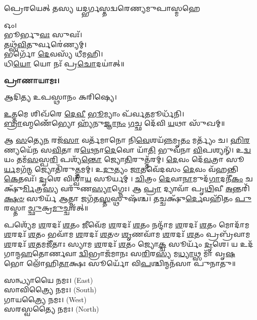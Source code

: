 {𑌪𑍍𑌰𑍇𑌰𑌯𑍇𑌤𑍍 𑌤𑌸𑍍𑌯 𑌯𑌦𑍍𑌭𑌰𑍍𑌗𑌸𑍍𑌤𑌦𑍍𑌵𑌰𑍇𑌣𑍍𑌯𑌮𑍁𑌪𑌾𑌸𑍍𑌮𑌹𑍇}


𑌓𑌂।\\
𑌭𑍂𑌰𑍍𑌭𑍁\-\ul{𑌵𑌃} 𑌸𑍁𑌵𑌃᳴।\\
𑌤𑌥𑍍𑌸᳴\-\ul{𑌵𑌿}\-𑌤𑍁𑌰𑍍𑌵𑌰𑍇॑𑌣𑍍𑌯𑌮𑍍।\\
𑌭𑌰𑍍𑌗𑍋᳴ \ul{𑌦𑍇}\-𑌵𑌸𑍍𑌯᳴ 𑌧𑍀𑌮𑌹𑌿।\\
𑌧𑌿\-\ul{𑌯𑍋} 𑌯𑍋 𑌨𑌃᳴ 𑌪𑍍𑌰\-\ul{𑌚𑍋}\-𑌦𑌯𑌾॑𑌤𑍍॥

\textbf{𑌪𑍍𑌰𑌾𑌣𑌾𑌯𑌾𑌮𑌃।}


𑌆𑌦𑌿𑌤𑍍𑌯 𑌉𑌪𑌸𑍍𑌥𑌾𑌨𑌂 𑌕𑌰𑌿𑌷𑍍𑌯𑍇।

\-\ul{𑌉}\-𑌤𑍍𑌤𑌮𑍇 𑌶𑌿𑌖᳴𑌰𑍇 \ul{𑌦𑍇}\-\-\ul{𑌵𑍀} \ul{𑌭𑍂}\-𑌮𑍍𑌯𑌾𑌂 𑌪᳴𑌰𑍍𑌵\-\ul{𑌤}\-𑌮𑍂𑌰𑍍𑌧᳴𑌨𑌿।\\
\-\ul{𑌬𑍍𑌰𑌾}\-𑌹𑍍𑌮𑌣𑍇᳴᳴𑌭𑍍𑌯𑍋 𑌹𑍍𑌯᳴𑌨𑍁\-\ul{𑌜𑍍𑌞𑌾}\-\-\ul{𑌨𑌂} \ul{𑌗}\-𑌚𑍍𑌛 𑌦𑍇᳴𑌵𑌿 \ul{𑌯}\-𑌥𑌾 𑌸𑍁᳴𑌖𑌮𑍍॥



𑌆 \ul{𑌸}\-𑌤𑍍𑌯𑍇\-\ul{𑌨} 𑌰𑌜᳴\-\ul{𑌸𑌾} 𑌵𑌰𑍍𑌤᳴𑌮𑌾𑌨𑍋 𑌨𑌿\-\ul{𑌵𑍇}\-𑌶𑌯᳴\-\ul{𑌨𑍍𑌨}\-𑌮𑍃\-\ul{𑌤𑌂} 𑌮𑌰𑍍𑌤𑍍𑌯𑌂᳴ 𑌚। \ul{𑌹𑌿}\-\-\ul{𑌰}\-𑌣𑍍𑌯𑌯𑍇᳴𑌨 𑌸\-\ul{𑌵𑌿}\-𑌤𑌾 𑌰\-\ul{𑌥𑍇}\-𑌨𑌾\-\ul{𑌦𑍇}\-𑌵𑍋 𑌯𑌾᳴\-\ul{𑌤𑌿} 𑌭𑍁𑌵᳴𑌨𑌾 \ul{𑌵𑌿}\-𑌪𑌶𑍍𑌯𑌨𑍍᳴। 𑌉\-\ul{𑌦𑍍𑌵}\-𑌯𑌂 𑌤𑌮᳴\-\ul{𑌸}\-𑌸𑍍𑌪\-\ul{𑌰𑌿} 𑌪𑌶𑍍𑌯᳴\-\ul{𑌨𑍍𑌤𑍋} 𑌜𑍍𑌯𑍋\-\ul{𑌤𑌿}\-𑌰𑍁𑌤𑍍𑌤᳴𑌰𑌮𑍍। \ul{𑌦𑍇}\-𑌵𑌂 𑌦𑍇᳴\-\ul{𑌵}\-𑌤𑍍𑌰𑌾 𑌸𑍂\-\ul{𑌰𑍍𑌯}\-𑌮𑌗᳴\-\ul{𑌨𑍍𑌮} 𑌜𑍍𑌯𑍋𑌤𑌿᳴𑌰𑍁\-\ul{𑌤𑍍𑌤}\-𑌮𑌮𑍍। 𑌉\-\ul{𑌦𑍁}\-𑌤𑍍𑌯𑌂 \ul{𑌜𑌾}\-𑌤𑌵𑍇᳴𑌦𑌸𑌂 \ul{𑌦𑍇}\-𑌵𑌂 𑌵᳴𑌹𑌨𑍍𑌤𑌿 \ul{𑌕𑍇}\-𑌤𑌵𑌃᳴। \ul{𑌦𑍃}\-𑌶𑍇 𑌵𑌿𑌶𑍍𑌵𑌾᳴\-\ul{𑌯} 𑌸𑍂𑌰𑍍𑌯𑌮𑍍। \ul{𑌚𑌿}\-𑌤𑍍𑌰𑌂 \ul{𑌦𑍇}\-𑌵𑌾\-\ul{𑌨𑌾}\-𑌮𑍁𑌦᳴\-\ul{𑌗𑌾}\-𑌦𑌨𑍀᳴\-\ul{𑌕𑌂} 𑌚𑌕𑍍𑌷𑍁᳴\-\ul{𑌰𑍍𑌮𑌿}\-𑌤𑍍𑌰\-\ul{𑌸𑍍𑌯} 𑌵𑌰𑍁᳴𑌣\-\ul{𑌸𑍍𑌯𑌾}\-𑌗𑍍𑌨𑍇𑌃। 𑌆 \ul{𑌪𑍍𑌰𑌾} 𑌦𑍍𑌯𑌾𑌵𑌾᳴ 𑌪𑍃\-\ul{𑌥𑌿}\-𑌵𑍀 \ul{𑌅}\-𑌨𑍍𑌤𑌰𑌿᳴\-\ul{𑌕𑍍𑌷}\-\-\ul{𑍞} 𑌸𑍂𑌰𑍍𑌯᳴ \ul{𑌆}\-𑌤𑍍𑌮𑌾 𑌜𑌗᳴𑌤\-\ul{𑌸𑍍𑌤}\-𑌸𑍍𑌥𑍁𑌷᳴𑌶𑍍𑌚। 𑌤𑌚𑍍𑌚𑌕𑍍𑌷𑍁᳴\-\ul{𑌰𑍍𑌦𑍇}\-𑌵𑌹𑌿᳴𑌤𑌂 \ul{𑌪𑍁}\-𑌰𑌸𑍍𑌤𑌾\-\ul{𑌚𑍍𑌛𑍁}\-𑌕𑍍𑌰\-\ul{𑌮𑍁}\-𑌚𑍍𑌚𑌰᳴𑌤𑍍॥

𑌪𑌶𑍍𑌯𑍇᳴𑌮 \ul{𑌶}\-𑌰𑌦𑌃᳴ \ul{𑌶}\-𑌤𑌂 𑌜𑍀𑌵𑍇᳴𑌮 \ul{𑌶}\-𑌰𑌦𑌃᳴ \ul{𑌶}\-𑌤𑌂 𑌨𑌨𑍍𑌦𑌾᳴𑌮 \ul{𑌶}\-𑌰𑌦𑌃᳴ \ul{𑌶}\-𑌤𑌂 𑌮𑍋𑌦𑌾᳴𑌮 \ul{𑌶}\-𑌰𑌦𑌃᳴ \ul{𑌶}\-𑌤𑌂 𑌭𑌵𑌾᳴𑌮 \ul{𑌶}\-𑌰𑌦𑌃᳴ \ul{𑌶}\-𑌤𑍞 \ul{𑌶𑍃}\-𑌣𑌵𑌾᳴𑌮 \ul{𑌶}\-𑌰𑌦𑌃᳴ \ul{𑌶}\-𑌤𑌂 𑌪𑍍𑌰𑌬𑍍𑌰᳴𑌵𑌾𑌮 \ul{𑌶}\-𑌰𑌦𑌃᳴ \ul{𑌶}\-𑌤𑌮𑌜𑍀᳴𑌤𑌾𑌃 𑌸𑍍𑌯𑌾𑌮 \ul{𑌶}\-𑌰𑌦𑌃᳴ \ul{𑌶}\-𑌤𑌂 𑌜𑍍𑌯𑍋\-\ul{𑌕𑍍𑌚} 𑌸𑍂𑌰𑍍𑌯𑌂᳴ \ul{𑌦𑍃}\-𑌶𑍇। 𑌯 𑌉𑌦᳴𑌗𑌾𑌨𑍍𑌮\-\ul{𑌹}\-𑌤𑍋𑌰𑍍𑌣𑌵𑌾\-\ul{𑌦𑍍𑌵𑌿}\-𑌭𑍍𑌰𑌾𑌜᳴𑌮𑌾𑌨𑌃 𑌸\-\ul{𑌰𑌿}\-𑌰\-\ul{𑌸𑍍𑌯} 𑌮\-\ul{𑌧𑍍𑌯𑌾}\-𑌥𑍍𑌸 𑌮𑌾᳴ 𑌵𑍃\-\ul{𑌷}\-𑌭𑍋 𑌲𑍋᳴𑌹𑌿\-\ul{𑌤𑌾}\-𑌕𑍍𑌷𑌃 𑌸𑍂𑌰𑍍𑌯𑍋᳴ 𑌵𑌿\-\ul{𑌪}\-𑌶𑍍𑌚𑌿𑌨𑍍𑌮𑌨᳴𑌸𑌾 𑌪𑍁𑌨𑌾𑌤𑍁॥



𑌸𑌨𑍍𑌧𑍍𑌯𑌾𑌯𑍈 𑌨𑌮𑌃।  {\scriptsize (East)}\\
𑌸𑌾𑌵𑌿𑌤𑍍𑌰𑍍𑌯𑍈 𑌨𑌮𑌃। {\scriptsize (South)}\\
𑌗𑌾𑌯𑌤𑍍𑌰𑍍𑌯𑍈 𑌨𑌮𑌃।  {\scriptsize (West)}\\
𑌸𑌰𑌸𑍍𑌵𑌤𑍍𑌯𑍈 𑌨𑌮𑌃।  {\scriptsize (North)}

